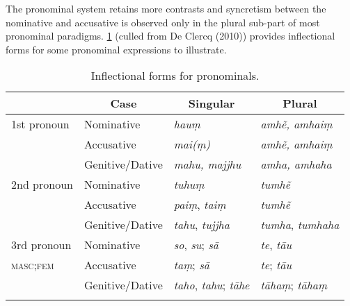 \documentclass[output=paper,
modfonts
]{LSP/langsci}
\begin{document}
The pronominal system retains more contrasts and syncretism between the nominative and accusative is observed only in the plural sub-part of most pronominal paradigms. \cref{tab:pron} (culled from De Clercq (2010)) provides inflectional forms for some pronominal expressions to illustrate.



\begin{table}
\begin{tabular}[t]{llll}
\lsptoprule
\multicolumn{1}{c}{Stem} & \multicolumn{1}{c}{Case} & \multicolumn{1}{c}{Singular} & \multicolumn{1}{c}{Plural} \\
\midrule
 1st pronoun & Nominative  & \textit{hauṃ} &  \textit{amhẽ, amhaiṃ} \\
 & Accusative& \textit{mai(ṃ)} & \textit{amhẽ, amhaiṃ} \\ 
 & Genitive/Dative& \textit{mahu, majjhu} & \textit{amha, amhaha} \\[2ex]
 2nd pronoun & Nominative  & \textit{tuhuṃ} & \textit{tumhẽ} \\ 
 & Accusative  & \textit{paiṃ}, \textit{taiṃ} & \textit{tumhẽ}\\
 & Genitive/Dative & \textit{tahu}, \textit{tujjha} & \textit{tumha}, \textit{tumhaha} \\[2ex]
 3rd pronoun  & Nominative &  \textit{so}, \textit{su}; \textit{sā} & \textit{te}, \textit{tāu}  \\
\textsc{masc;fem} & Accusative & \textit{taṃ}; \textit{sā} &  \textit{te};  \textit{tāu} \\
  & Genitive/Dative & \textit{taho}, \textit{tahu}; \textit{tāhe} & \textit{tāhaṃ}; \textit{tāhaṃ} \\
 \lspbottomrule
\end{tabular}
\caption{Inflectional forms for pronominals.}
\label{tab:pron}
\end{table}
\end{document}
